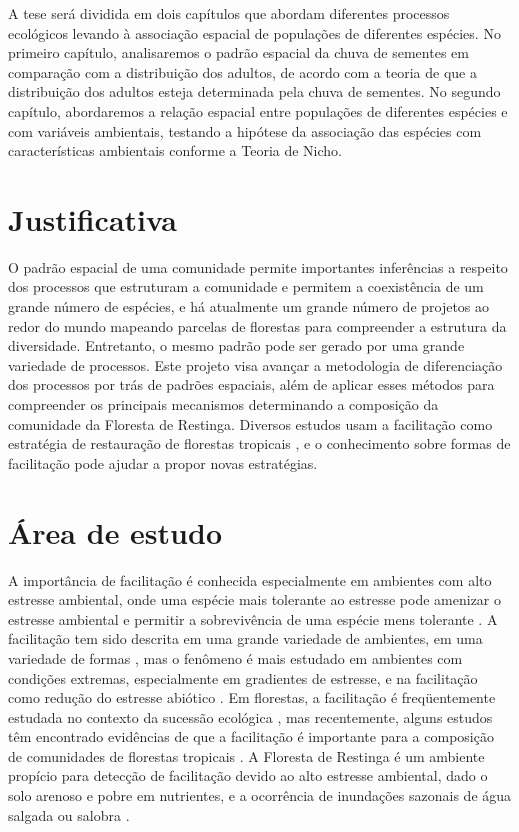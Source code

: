 \documentclass[twoside,12pt,a4paper]{report}
\begin{document}
A tese será dividida em dois capítulos que abordam diferentes processos ecológicos levando à
associação espacial de populações de diferentes espécies. No primeiro capítulo, analisaremos o
padrão espacial da chuva de sementes em comparação com a distribuição dos adultos, de acordo com a
teoria de que a distribuição dos adultos esteja determinada pela chuva de sementes. No segundo
capítulo, abordaremos a relação espacial entre populações de diferentes espécies e com variáveis
ambientais, testando a hipótese da associação das espécies com características ambientais conforme a
Teoria de Nicho.


\section{Justificativa}

O padrão espacial de uma comunidade permite importantes inferências a respeito dos processos que
estruturam a comunidade e permitem a coexistência de um grande número de espécies, e há atualmente
um grande número de projetos ao redor do mundo mapeando parcelas de florestas para compreender a
estrutura da diversidade. Entretanto, o mesmo padrão pode ser gerado por uma grande variedade de
processos. Este projeto visa avançar a metodologia de diferenciação dos processos por trás de
padrões espaciais, além de aplicar esses métodos para compreender os principais mecanismos
determinando a composição da comunidade da Floresta de Restinga. Diversos estudos usam a facilitação
como estratégia de restauração de florestas tropicais \citep{Zwiener2014,ref}, e o
conhecimento sobre formas de facilitação pode ajudar a propor novas estratégias.

\section{Área de estudo}
A importância de facilitação é conhecida especialmente em ambientes com alto estresse
ambiental, onde uma espécie mais tolerante ao estresse pode amenizar o estresse ambiental e
permitir a sobrevivência de uma espécie mens tolerante \citep{BertnessHacker1994,
CallawayHacker1995}. 
A facilitação tem sido descrita em uma grande variedade de ambientes, em
uma variedade de formas \citep{McIntire2014}, mas o fenômeno é mais estudado em ambientes com
condições extremas, especialmente em gradientes de estresse, e na facilitação como redução do
estresse abiótico \citep{Brooker2008}. Em florestas, a facilitação é freqüentemente
estudada no contexto da sucessão ecológica \citep{refs refs refs}, mas recentemente, alguns
estudos têm encontrado evidências de que a facilitação é importante para a composição de
comunidades de florestas tropicais
\citep{Ledo2015,refs}. A Floresta de Restinga é um ambiente propício para detecção de facilitação devido ao alto estresse
ambiental, dado o solo arenoso e pobre em nutrientes, e a ocorrência de inundações sazonais de água
salgada ou salobra \citep{TODO refs}. 
\end{document}
